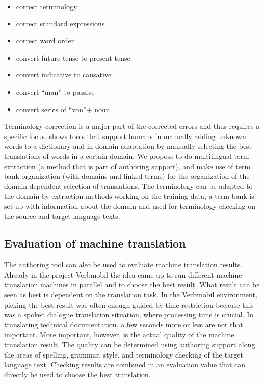 \documentclass[output=paper]{LSP/langsci}
\begin{document}
\begin{itemize}
\item
correct terminology
\item
correct standard expressions
\item
correct word order
\item
convert future tense to present tense
\item
convert indicative to causative
\item
convert ``man'' to passive
\item
convert series of ``von''+ noun
\end{itemize}

Terminology correction is a major part of the corrected errors and thus requires a specific focus. \citet{Allen2001} shows tools that support humans in manually adding unknown words to a dictionary and in domain-adaptation by manually selecting the best translations of words in a certain domain. We propose to do multilingual term extraction (a method that is part of authoring support), and make use of term bank organization (with domains and linked terms) for the organization of the domain-dependent selection of translations. The terminology can be adapted to the domain by extraction methods working on the training data; a term bank is set up with information about the domain and used for terminology checking on the source and target language texts.

\subsection{Evaluation of machine translation}\label{sec:siegel:4.3}

The authoring tool can also be used to evaluate machine translation results. Already in the project Verbmobil \citep{Wahlster2000} the idea came up to run different machine translation machines in parallel and to choose the best result. What result can be seen as best is dependent on the translation task. In the Verbmobil environment, picking the best result was often enough guided by time restriction because this was a spoken dialogue translation situation, where processing time is crucial. In translating technical documentation, a few seconds more or less are not that important. More important, however, is the actual quality of the machine translation result. The quality can be determined using authoring support along the areas of spelling, grammar, style, and terminology checking of the target language text. Checking results are combined in an evaluation value that can directly be used to choose the best translation.
\end{document}
